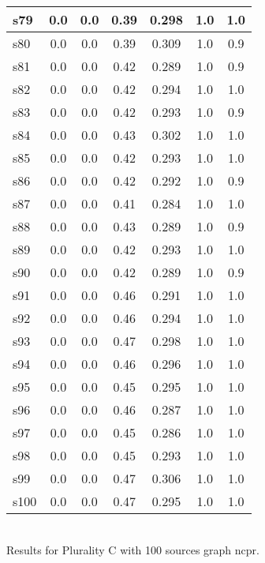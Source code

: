 \documentclass{article}
\begin{document}
\begin{tabular}{|l|c|c|c|c|c|c|}
\hline
s79 &0.0 & 0.0 & 0.39 & 0.298 & 1.0 & 1.0\\
\hline
s80 &0.0 & 0.0 & 0.39 & 0.309 & 1.0 & 0.9\\
\hline
s81 &0.0 & 0.0 & 0.42 & 0.289 & 1.0 & 0.9\\
\hline
s82 &0.0 & 0.0 & 0.42 & 0.294 & 1.0 & 1.0\\
\hline
s83 &0.0 & 0.0 & 0.42 & 0.293 & 1.0 & 0.9\\
\hline
s84 &0.0 & 0.0 & 0.43 & 0.302 & 1.0 & 1.0\\
\hline
s85 &0.0 & 0.0 & 0.42 & 0.293 & 1.0 & 1.0\\
\hline
s86 &0.0 & 0.0 & 0.42 & 0.292 & 1.0 & 0.9\\
\hline
s87 &0.0 & 0.0 & 0.41 & 0.284 & 1.0 & 1.0\\
\hline
s88 &0.0 & 0.0 & 0.43 & 0.289 & 1.0 & 0.9\\
\hline
s89 &0.0 & 0.0 & 0.42 & 0.293 & 1.0 & 1.0\\
\hline
s90 &0.0 & 0.0 & 0.42 & 0.289 & 1.0 & 0.9\\
\hline
s91 &0.0 & 0.0 & 0.46 & 0.291 & 1.0 & 1.0\\
\hline
s92 &0.0 & 0.0 & 0.46 & 0.294 & 1.0 & 1.0\\
\hline
s93 &0.0 & 0.0 & 0.47 & 0.298 & 1.0 & 1.0\\
\hline
s94 &0.0 & 0.0 & 0.46 & 0.296 & 1.0 & 1.0\\
\hline
s95 &0.0 & 0.0 & 0.45 & 0.295 & 1.0 & 1.0\\
\hline
s96 &0.0 & 0.0 & 0.46 & 0.287 & 1.0 & 1.0\\
\hline
s97 &0.0 & 0.0 & 0.45 & 0.286 & 1.0 & 1.0\\
\hline
s98 &0.0 & 0.0 & 0.45 & 0.293 & 1.0 & 1.0\\
\hline
s99 &0.0 & 0.0 & 0.47 & 0.306 & 1.0 & 1.0\\
\hline
s100 &0.0 & 0.0 & 0.47 & 0.295 & 1.0 & 1.0\\
\hline
\end{tabular}\\

\noindent Results for Plurality C with 100 sources graph ncpr.
\end{document}
